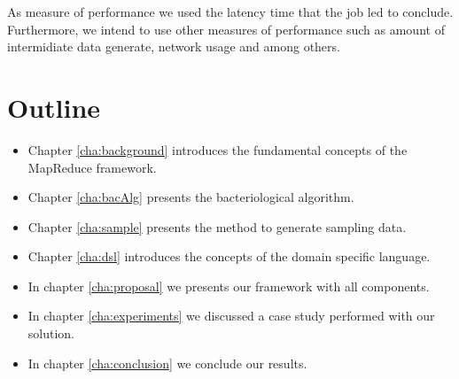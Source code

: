 As measure of performance we used the latency time that the job led to
conclude. Furthermore, we intend to use other measures of performance such as
amount of intermidiate data generate, network usage and among others.

\section{Outline}

\begin{itemize}
	\item Chapter \ref{cha:background} introduces the fundamental concepts of the MapReduce framework.
    \item Chapter \ref{cha:bacAlg} presents the bacteriological algorithm.
    \item Chapter \ref{cha:sample} presents the method to generate sampling
    data.
    \item Chapter \ref{cha:dsl} introduces the concepts of the domain specific language.
	\item In chapter \ref{cha:proposal} we presents our framework with all components.
    \item In chapter \ref{cha:experiments} we discussed a case study performed with our solution.
	\item In chapter \ref{cha:conclusion} we conclude our results.
\end{itemize}




